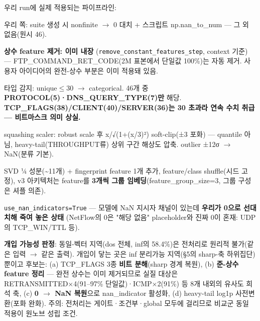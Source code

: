 우리 run에 실제 적용되는 파이프라인:

\par\noindent \textbullet\enspace 우리 쪽: suite 생성 시 nonfinite \ensuremath{\rightarrow} 0 대치 +\allowbreak{} 스크립트 np.nan\_\allowbreak{}to\_\allowbreak{}num — 그 외 없음(원시 46).


\par\noindent \textbullet\enspace \textbf{상수 feature 제거: 이미 내장} (\texttt{remove\_\allowbreak{}\allowbreak{}c\allowbreak{}onstant\_\allowbreak{}\allowbreak{}features\allowbreak{}\_\allowbreak{}\allowbreak{}step}, context 기준) — FTP\_\allowbreak{}COMMAND\_\allowbreak{}RET\_\allowbreak{}CODE(2M 표본에서 단일값 100\%)는 자동 제거. 사용자 아이디어의 완전-상수 부분은 이미 적용돼 있음.


\par\noindent \textbullet\enspace 타입 감지: unique\ensuremath{\leq}30  \ensuremath{\rightarrow}  categorical. 46개 중 \textbf{PROTOCOL(5)·DNS\_\allowbreak{}QUERY\_\allowbreak{}TYPE(7)만} 해당. \textbf{TCP\_\allowbreak{}FLAGS(38)/\allowbreak{}CLIENT(40)/\allowbreak{}SERVER(36)는 30 초과라 연속 수치 취급 — 비트마스크 의미 상실.}


\par\noindent \textbullet\enspace squashing scaler: robust scale 후 x/\allowbreak{}√(1+\allowbreak{}(x/\allowbreak{}3)²) soft-clip(±3 포화) — quantile 아님, heavy-tail(THROUGHPUT류) 상위 구간 해상도 압축. outlier ±12σ \ensuremath{\rightarrow} NaN(분류 기본).


\par\noindent \textbullet\enspace SVD ¼ 성분(\textasciitilde{}11개) +\allowbreak{} fingerprint feature 1개 추가, feature/\allowbreak{}class shuffle(시드 고정), v3 아키텍처는 feature를 \textbf{3개씩 그룹 임베딩}(feature\_\allowbreak{}group\_\allowbreak{}size=\allowbreak{}3, 그룹 구성은 셔플 의존).


\par\noindent \textbullet\enspace \texttt{use\_\allowbreak{}\allowbreak{}nan\_\allowbreak{}\allowbreak{}indicato\allowbreak{}rs=\allowbreak{}\allowbreak{}True} — 모델에 NaN 지시자 채널이 있는데 \textbf{우리가 0으로 선대치해 죽여 놓은 상태} (NetFlow의 0은 "해당 없음" placeholder와 진짜 0이 혼재: UDP의 TCP\_\allowbreak{}WIN/\allowbreak{}TTL 등).


\textbf{개입 가능성 판정}: 동일-벡터 지역(dos 전체, inf의 58.4\%)은 전처리로 원리적 불가(같은 입력  \ensuremath{\rightarrow}  같은 출력). 개입이 닿는 곳은 inf 분리가능 지역(§5의 sharp-축 하위집단)뿐이고 후보는: (a) TCP\_\allowbreak{}FLAGS 3종 \textbf{비트 분해}(sharp 경계 복원), (b) \textbf{준-상수 feature 정리} — 완전 상수는 이미 제거되므로 실질 대상은 RETRANSMITTED×4(91–97\% 단일값)·ICMP×2(91\%) 등 8개 내외의 유사도 희석 축, (c) \textbf{0 \ensuremath{\rightarrow} NaN 복원}으로 nan\_\allowbreak{}indicator 활성화, (d) heavy-tail log1p 사전변환(포화 완화). 주의: 전처리는 게이트·조건부·global 모두에 걸리므로 비교군 동일 적용이 원노브 성립 조건.

